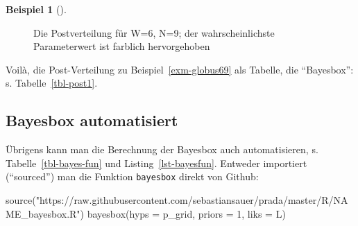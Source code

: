 \documentclass[
  ngerman,
  letterpaper,
  twoside,
  open=any]{scrbook}
\newenvironment{Shaded}{\begin{snugshade}}{\end{snugshade}}
\newcommand{\AttributeTok}[1]{\textcolor[rgb]{0.40,0.45,0.13}{#1}}
\newcommand{\DecValTok}[1]{\textcolor[rgb]{0.68,0.00,0.00}{#1}}
\newcommand{\FunctionTok}[1]{\textcolor[rgb]{0.28,0.35,0.67}{#1}}
\newcommand{\NormalTok}[1]{\textcolor[rgb]{0.00,0.23,0.31}{#1}}
\newcommand{\StringTok}[1]{\textcolor[rgb]{0.13,0.47,0.30}{#1}}
\theoremstyle{definition}
\newtheorem{example}{Beispiel}[chapter]
\theoremstyle{plain}
\theoremstyle{definition}
\theoremstyle{definition}
\theoremstyle{remark}
\begin{document}
\begin{example}[]
\begin{figure}[H]
{}

\caption{\label{fig-post1a}Die Postverteilung für W=6, N=9; der
wahrscheinlichste Parameterwert ist farblich hervorgehoben}

\end{figure}%

Voilà, die Post-Verteilung zu Beispiel~\ref{exm-globus69} als Tabelle,
die \enquote{Bayesbox}: s. Tabelle~\ref{tbl-post1}.

\begin{table}

\caption{\label{tbl-post1}Postverteilung mit der Bayesbox berechnet}


\end{table}%

\subsection{Bayesbox automatisiert}\label{bayesbox-automatisiert}

Übrigens kann man die Berechnung der Bayesbox auch automatisieren, s.
Tabelle~\ref{tbl-bayes-fun} und Listing~\ref{lst-bayesfun}. Entweder
importiert (\enquote{sourced}) man die Funktion \texttt{bayesbox} direkt
von Github:

\begin{Shaded}
\begin{Highlighting}[]
\FunctionTok{source}\NormalTok{(}\StringTok{"https://raw.githubusercontent.com/sebastiansauer/prada/master/R/NAME\_bayesbox.R"}\NormalTok{) }
\FunctionTok{bayesbox}\NormalTok{(}\AttributeTok{hyps =}\NormalTok{ p\_grid, }\AttributeTok{priors =} \DecValTok{1}\NormalTok{, }\AttributeTok{liks =}\NormalTok{ L) }
\end{Highlighting}
\end{Shaded}


\end{example}
\end{document}
